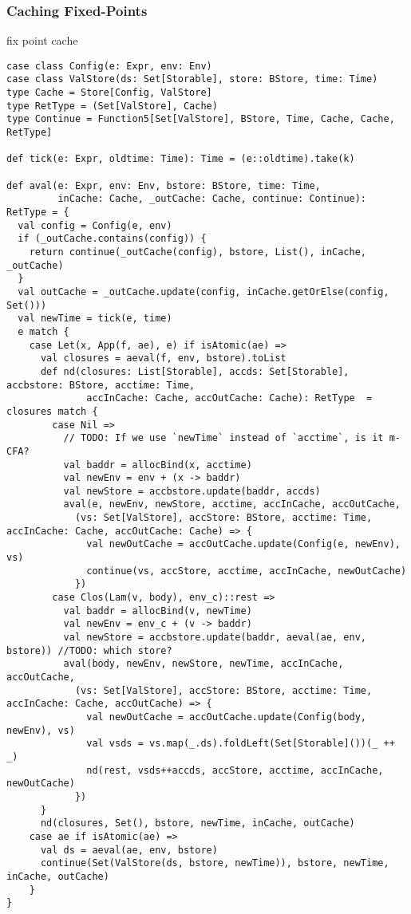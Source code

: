 \documentclass[acmsmall,review,anonymous]{acmart}\settopmatter{printfolios=true,printccs=false,printacmref=false}
\begin{document}
\subsubsection{Caching Fixed-Points}

fix point cache

\begin{lstlisting}
case class Config(e: Expr, env: Env)
case class ValStore(ds: Set[Storable], store: BStore, time: Time)
type Cache = Store[Config, ValStore]
type RetType = (Set[ValStore], Cache)
type Continue = Function5[Set[ValStore], BStore, Time, Cache, Cache, RetType]

def tick(e: Expr, oldtime: Time): Time = (e::oldtime).take(k)

def aval(e: Expr, env: Env, bstore: BStore, time: Time,
         inCache: Cache, _outCache: Cache, continue: Continue): RetType = {
  val config = Config(e, env)
  if (_outCache.contains(config)) {
    return continue(_outCache(config), bstore, List(), inCache, _outCache)
  }
  val outCache = _outCache.update(config, inCache.getOrElse(config, Set()))
  val newTime = tick(e, time)
  e match {
    case Let(x, App(f, ae), e) if isAtomic(ae) =>
      val closures = aeval(f, env, bstore).toList
      def nd(closures: List[Storable], accds: Set[Storable], accbstore: BStore, acctime: Time,
              accInCache: Cache, accOutCache: Cache): RetType  = closures match {
        case Nil =>
          // TODO: If we use `newTime` instead of `acctime`, is it m-CFA?
          val baddr = allocBind(x, acctime)
          val newEnv = env + (x -> baddr)
          val newStore = accbstore.update(baddr, accds)
          aval(e, newEnv, newStore, acctime, accInCache, accOutCache,
            (vs: Set[ValStore], accStore: BStore, acctime: Time, accInCache: Cache, accOutCache: Cache) => {
              val newOutCache = accOutCache.update(Config(e, newEnv), vs)
              continue(vs, accStore, acctime, accInCache, newOutCache)
            })
        case Clos(Lam(v, body), env_c)::rest =>
          val baddr = allocBind(v, newTime)
          val newEnv = env_c + (v -> baddr)
          val newStore = accbstore.update(baddr, aeval(ae, env, bstore)) //TODO: which store?
          aval(body, newEnv, newStore, newTime, accInCache, accOutCache,
            (vs: Set[ValStore], accStore: BStore, acctime: Time, accInCache: Cache, accOutCache) => {
              val newOutCache = accOutCache.update(Config(body, newEnv), vs)
              val vsds = vs.map(_.ds).foldLeft(Set[Storable]())(_ ++ _)
              nd(rest, vsds++accds, accStore, acctime, accInCache, newOutCache)
            })
      }
      nd(closures, Set(), bstore, newTime, inCache, outCache)
    case ae if isAtomic(ae) =>
      val ds = aeval(ae, env, bstore)
      continue(Set(ValStore(ds, bstore, newTime)), bstore, newTime, inCache, outCache)
    }
}


\end{lstlisting}
\end{document}
